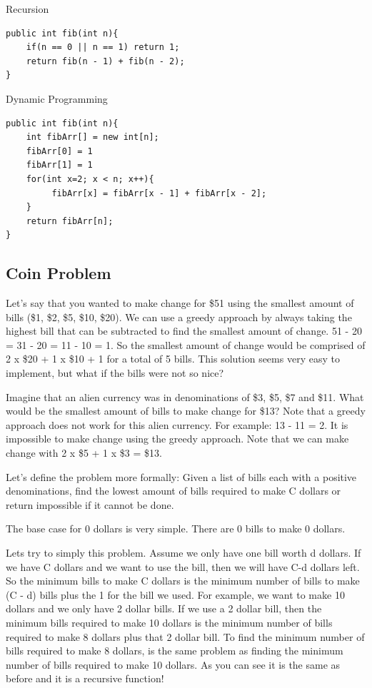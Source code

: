 \documentclass[11pt,oneside]{book}
\begin{document}
Recursion

\begin{lstlisting}
public int fib(int n){
    if(n == 0 || n == 1) return 1;
    return fib(n - 1) + fib(n - 2);
}
\end{lstlisting}

Dynamic Programming

\begin{lstlisting}
public int fib(int n){
    int fibArr[] = new int[n];
    fibArr[0] = 1
    fibArr[1] = 1
    for(int x=2; x < n; x++){
         fibArr[x] = fibArr[x - 1] + fibArr[x - 2];
    }
    return fibArr[n];
}
\end{lstlisting}

\subsection{Coin Problem}

Let's say that you wanted to make change for \$51 using the smallest amount of bills (\$1, \$2, \$5, \$10, \$20). We can use a greedy approach by always taking the highest bill that can be subtracted to find the smallest amount of change. 51 - 20 = 31 - 20 = 11 - 10 = 1. So the smallest amount of change would be comprised of 2 x \$20 + 1 x \$10 + 1 for a total of 5 bills. This solution seems very easy to implement, but what if the bills were not so nice?

Imagine that an alien currency was in denominations of \$3, \$5, \$7 and \$11. What would be the smallest amount of bills to make change for \$13? Note that a greedy approach does not work for this alien currency. For example: 13 - 11 = 2. It is impossible to make change using the greedy approach. Note that we can make change with 2 x \$5 + 1 x \$3 = \$13.

Let's define the problem more formally: Given a list of bills each with a positive denominations, find the lowest amount of bills required to make C dollars or return impossible if it cannot be done.

The base case for 0 dollars is very simple. There are 0 bills to make 0 dollars.

Lets try to simply this problem. Assume we only have one bill worth d dollars. If we have C dollars and we want to use the bill, then we will have C-d dollars left. So the minimum bills to make C dollars is the minimum number of bills to make (C - d) bills plus the 1 for the bill we used. For example, we want to make 10 dollars and we only have 2 dollar bills. If we use a 2 dollar bill, then the minimum bills required to make 10 dollars is the minimum number of bills required to make 8 dollars plus that 2 dollar bill. To find the minimum number of bills required to make 8 dollars, is the same problem as finding the minimum number of bills required to make 10 dollars. As you can see it is the same as before and it is a recursive function!
\end{document}
